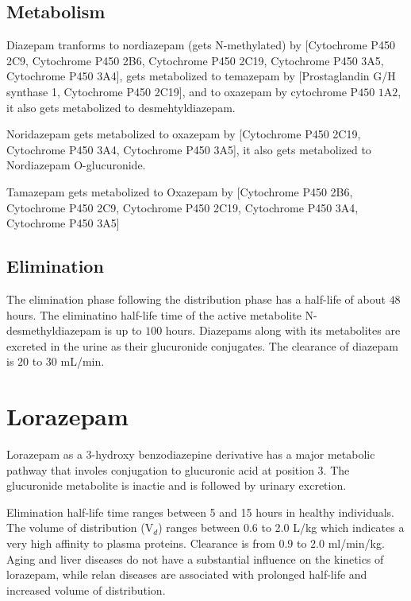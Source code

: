 \subsection{Metabolism}
Diazepam tranforms to nordiazepam (gets N-methylated) by [Cytochrome P450 2C9, Cytochrome P450 2B6, Cytochrome P450 2C19, Cytochrome P450 3A5, Cytochrome P450 3A4],\cite{zhou2009substrates} gets metabolized to temazepam by [Prostaglandin G/H synthase 1, Cytochrome P450 2C19], and to oxazepam by cytochrome P$450$ $1$A$2$, it also gets metabolized to desmehtyldiazepam.

Noridazepam gets metabolized to oxazepam by [Cytochrome P450 2C19, Cytochrome P450 3A4, Cytochrome P450 3A5], it also gets metabolized to Nordiazepam O-glucuronide.

Tamazepam gets metabolized to Oxazepam by [Cytochrome P450 2B6, Cytochrome P450 2C9, Cytochrome P450 2C19, Cytochrome P450 3A4, Cytochrome P450 3A5]

\subsection{Elimination}
The elimination phase following the distribution phase has a half-life of about $48$ hours. The eliminatino half-life time of the active metabolite N-desmethyldiazepam is up to $100$ hours. Diazepams along with its metabolites are excreted in the urine as their glucuronide conjugates. The clearance of diazepam is $20$ to $30$ mL/min. 

\section{Lorazepam}
Lorazepam as a 3-hydroxy benzodiazepine derivative has a major metabolic pathway that involes conjugation to glucuronic acid at position 3. The glucuronide metabolite is inactie and is followed by urinary excretion.

Elimination half-life time ranges between 5 and 15 hours in healthy individuals. The volume of distribution (V$_d$) ranges between 0.6 to 2.0 L/kg which indicates a very high affinity to plasma proteins. Clearance is from $0.9$ to $2.0$ ml/min/kg. Aging and liver diseases do not have a substantial influence on the kinetics of lorazepam, while relan diseases are associated with prolonged half-life and increased volume of distribution.\cite{Greenblatt1981}
